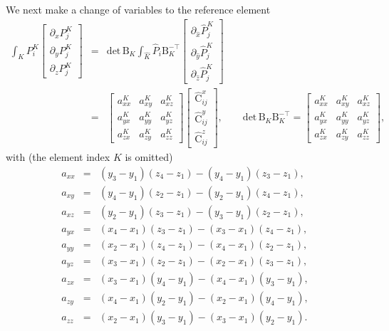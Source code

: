 \documentclass[10pt,english]{article}
\begin{document}
We next make a change of variables to the reference element
\begin{eqnarray*}
\int_K P_i^K \left[\begin{array}{c}\partial_x P_j^K \\[1.3ex]
\partial_y P_j^K\\[1.3ex]
\partial_z P_j^K
\end{array}\right] &=& \mathrm{det}\,\mathrm B_K \int_{\widehat K} \widehat P_i \mathrm B_K^{-\top} \left[\begin{array}{c}\partial_{\widehat x} \widehat P_j^K \\[1.3ex]
\partial_{\widehat y} \widehat P_j^K\\[1.3ex]
\partial_{\widehat z} \widehat P_j^K
\end{array}\right]\\
&=&\left[ \begin{array}{ccc} a_{xx}^K & a_{xy}^K & a_{xz}^K \\[1.5ex] a_{yx}^K & a_{yy}^K & a_{yz}^K \\[1.5ex] a_{zx}^K & a_{zy}^K & a_{zz}^K\end{array}\right]
\left[\begin{array}{c} \widehat{\mathrm C}_{ij}^x \\[1.3ex] \widehat{\mathrm C}_{ij}^y\\[1.3ex] \widehat{\mathrm C}_{ij}^z\end{array}\right], \qquad 
\mathrm{det}\,\mathrm B_K\mathrm B_K^{-\top}=\left[ \begin{array}{ccc} a_{xx}^K & a_{xy}^K & a_{xz}^K \\[1.5ex] a_{yx}^K & a_{yy}^K & a_{yz}^K \\[1.5ex] a_{zx}^K & a_{zy}^K & a_{zz}^K\end{array}\right], 
\end{eqnarray*}
with (the element index $K$ is omitted)
\begin{eqnarray*}
a_{xx} &=& (y_3-y_1) (z_4-z_1)-(y_4-y_1) (z_3-z_1),\\
a_{xy} &=& (y_4-y_1) (z_2-z_1)-(y_2-y_1) (z_4-z_1),\\
a_{xz} &=& (y_2-y_1) (z_3-z_1)-(y_3-y_1) (z_2-z_1),\\
a_{yx} &=& (x_4-x_1) (z_3-z_1)-(x_3-x_1) (z_4-z_1),\\
a_{yy} &=& (x_2-x_1) (z_4-z_1)-(x_4-x_1) (z_2-z_1),\\
a_{yz} &=& (x_3-x_1) (z_2-z_1)-(x_2-x_1) (z_3-z_1),\\
a_{zx} &=& (x_3-x_1) (y_4-y_1)-(x_4-x_1) (y_3-y_1),\\
a_{zy} &=& (x_4-x_1) (y_2-y_1)-(x_2-x_1) (y_4-y_1),\\
a_{zz} &=& (x_2-x_1) (y_3-y_1)-(x_3-x_1) (y_2-y_1).\\
\end{eqnarray*}
\end{document}
